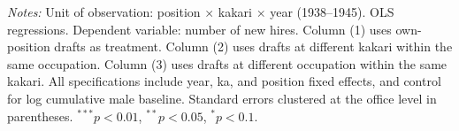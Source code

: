 \begin{table}[htbp]
\begin{threeparttable}
\begin{tabular}{lccc}
\end{tabular}
\begin{tablenotes}[flushleft]
\footnotesize
\item \textit{Notes:} Unit of observation: position $\times$ kakari $\times$ year (1938--1945). OLS regressions. Dependent variable: number of new hires. Column (1) uses own-position drafts as treatment. Column (2) uses drafts at different kakari within the same occupation. Column (3) uses drafts at different occupation within the same kakari. All specifications include year, ka, and position fixed effects, and control for log cumulative male baseline. Standard errors clustered at the office level in parentheses. $^{***}p<0.01$, $^{**}p<0.05$, $^{*}p<0.1$.
\end{tablenotes}
\end{threeparttable}
\end{table}
